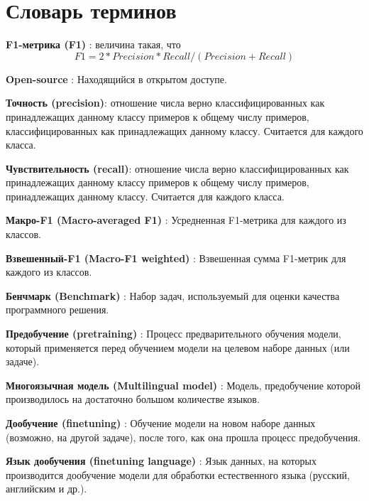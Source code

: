 \chapter*{Словарь терминов}             %

\textbf{F1-метрика (F1)} : величина такая, что \begin{equation}
F1 = 2*Precision*Recall/(Precision+Recall)
\end{equation}

\textbf{Open-source} : Находящийся в открытом доступе.

\textbf{Точность (precision)}: отношение числа верно классифицированных как принадлежащих данному классу примеров к общему числу примеров, классифицированных как принадлежащих данному классу. Считается для каждого класса.

\textbf{Чувствительность (recall)}: отношение числа верно классифицированных как принадлежащих данному классу примеров к общему числу примеров, принадлежащих данному классу. Считается для каждого класса.



\textbf{Макро-F1 (Macro-averaged F1)} : Усредненная F1-метрика для каждого из классов.

\textbf{Взвешенный-F1 (Macro-F1 weighted)} : Взвешенная сумма F1-метрик для каждого из классов.

\textbf{Бенчмарк (Benchmark)} : Набор задач, используемый для оценки качества программного решения.

\textbf{Предобучение (pretraining)} : Процесс предварительного обучения модели, который
применяется перед обучением модели на целевом наборе данных (или задаче). 

\textbf{Многоязычная модель (Multilingual model)} : Модель, предобучение которой производилось на достаточно большом количестве языков.

\textbf{Дообучение (finetuning)} : Обучение модели на новом наборе данных (возможно, на другой задаче), после того, как она прошла процесс предобучения.

\textbf{Язык дообучения (finetuning language)} : Язык данных, на которых производится дообучение модели для обработки естественного языка (русский, английским и др.).


